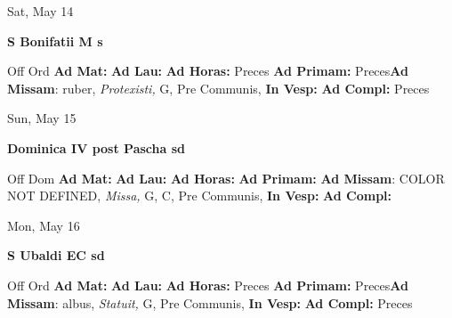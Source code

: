 \documentclass[10pt]{book}
\begin{document}
\begin{center}
\begin{minipage}{3.5in}
\vspace{2em}
\begin{center}Sat, May 14
\end{center}
\textbf{ \large S Bonifatii M
\textnormal{\normalsize s}}

\begin{justify}Off Ord
\textbf{Ad Mat: }
\textbf{Ad Lau: }
\textbf{Ad Horas: }Preces
\textbf{Ad Primam: }Preces\textbf{Ad Missam}: ruber, \textit{Protexisti,} G, Pre Communis, 
\textbf{In Vesp: }
\textbf{Ad Compl: }Preces
\end{justify}
\end{minipage}
\end{center}

\begin{center}
\begin{minipage}{3.5in}
\vspace{2em}
\begin{center}Sun, May 15
\end{center}
\textbf{ \large Dominica IV post Pascha
\textnormal{\normalsize sd}}

\begin{justify}Off Dom
\textbf{Ad Mat: }
\textbf{Ad Lau: }
\textbf{Ad Horas: }
\textbf{Ad Primam: }\textbf{Ad Missam}: COLOR NOT DEFINED, \textit{Missa,} G, C, Pre Communis, 
\textbf{In Vesp: }
\textbf{Ad Compl: }
\end{justify}
\end{minipage}
\end{center}

\begin{center}
\begin{minipage}{3.5in}
\vspace{2em}
\begin{center}Mon, May 16
\end{center}
\textbf{ \large S Ubaldi EC
\textnormal{\normalsize sd}}

\begin{justify}Off Ord
\textbf{Ad Mat: }
\textbf{Ad Lau: }
\textbf{Ad Horas: }Preces
\textbf{Ad Primam: }Preces\textbf{Ad Missam}: albus, \textit{Statuit,} G, Pre Communis, 
\textbf{In Vesp: }
\textbf{Ad Compl: }Preces
\end{justify}
\end{minipage}
\end{center}
\end{document}
